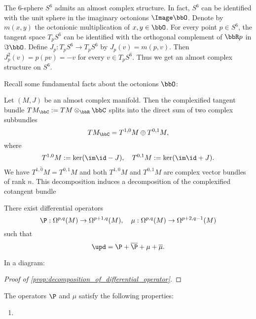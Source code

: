     \begin{example}\label{eg:almost_complex_structure_on_S6}
        The \(6\)-sphere \(S^6\) admits an almost complex structure.
        In fact, \(S^6\) can be identified with the unit sphere in the imaginary octonions \(\Image \bbO\).
        Denote by \(m(x,y)\) the octonionic multiplication of \(x,y\in \bbO\).
        For every point \(p\in S^6\), the tangent space \(T_pS^6\) can be identified with the orthogonal complement of \(\bbR p\) in \(\Im \bbO\).
        Define \(J_p: T_pS^6 \to T_pS^6\) by \(J_p(v) = m(p,v)\).
        Then \(J_p^2(v) = p(pv) = -v\) for every \(v\in T_pS^6\).
        Thus we get an almost complex structure on \(S^6\).
    \end{example}
    \begin{remark}\label{rmk:fundamental_facts_about_octonion_for_almost_complex_structure_on_S6}
        Recall some fundamental facts about the octonions \(\bbO\):

    \end{remark}


    Let \((M,J)\) be an almost complex manifold.
    Then the complexified tangent bundle \(TM_\bbC  := TM \otimes_\bbR \bbC\) splits into the direct sum of two complex subbundles
    \[ T M_\bbC = T^{1,0}M \oplus T^{0,1}M, \]
    where 
    \[ T^{1,0}M := \ker (\im \id - J), \quad T^{0,1}M := \ker (\im \id + J). \]
    We have \(\overline{T^{1,0}M} = T^{0,1}M\) and both \(T^{1,0}M\) and \(T^{0,1}M\) are complex vector bundles of rank \(n\).
    This decomposition induces a decomposition of the complexified cotangent bundle

    \begin{proposition}\label{prop:decomposition_of_differential_operator}
        There exist differential operators
        \[ \P: \Omega^{p,q}(M) \to \Omega^{p+1,q}(M), \quad \mu: \Omega^{p,q}(M) \to \Omega^{p+2,q-1}(M) \]
        such that
        \[ \upd = \P + \overline{\P} + \mu + \overline{\mu}. \]
    \end{proposition}

    In a diagram:


    \begin{proof}[Proof of \cref{prop:decomposition_of_differential_operator}]
    \end{proof}

    \begin{proposition}\label{prop:properties_of_differential_operators}
        The operators \(\P\) and \(\mu\) satisfy the following properties:
        \begin{enumerate}
            \item 
        \end{enumerate}
    \end{proposition}